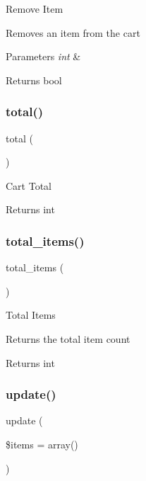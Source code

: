 Remove Item

Removes an item from the cart


\begin{DoxyParams}{Parameters}
{\em int} & \\
\hline
\end{DoxyParams}
\begin{DoxyReturn}{Returns}
bool 
\end{DoxyReturn}
\mbox{\label{class_c_i___cart_a9efa17b570797933c7c5b0c68f743a55}} 
\subsubsection{\texorpdfstring{total()}{total()}}
{\footnotesize\ttfamily total (\begin{DoxyParamCaption}{ }\end{DoxyParamCaption})}

Cart Total

\begin{DoxyReturn}{Returns}
int 
\end{DoxyReturn}
\mbox{\label{class_c_i___cart_a785be13903ee65b8936d523b2728e53a}} 
\subsubsection{\texorpdfstring{total\+\_\+items()}{total\_items()}}
{\footnotesize\ttfamily total\+\_\+items (\begin{DoxyParamCaption}{ }\end{DoxyParamCaption})}

Total Items

Returns the total item count

\begin{DoxyReturn}{Returns}
int 
\end{DoxyReturn}
\mbox{\label{class_c_i___cart_adddf5d1a4f704b647f28b0322f8b64f2}} 
\subsubsection{\texorpdfstring{update()}{update()}}
{\footnotesize\ttfamily update (\begin{DoxyParamCaption}\item[{}]{\$items = {\ttfamily array()} }\end{DoxyParamCaption})}

